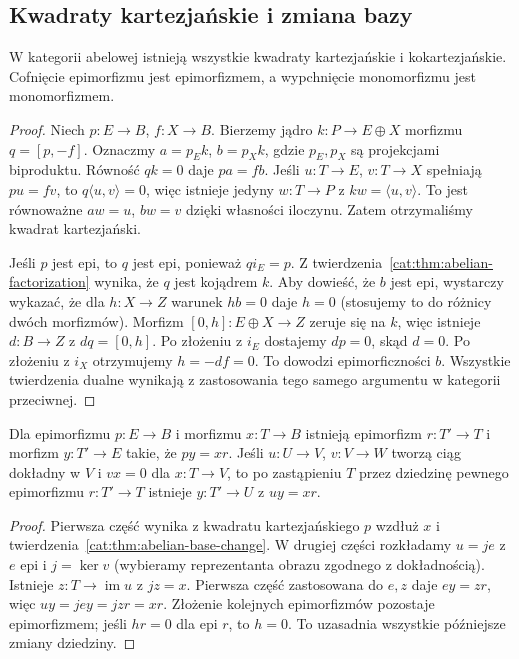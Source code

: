 \subsection{Kwadraty kartezjańskie i zmiana bazy}
\begin{twierdzenie}\label{cat:thm:abelian-base-change}
W kategorii abelowej istnieją wszystkie kwadraty kartezjańskie i kokartezjańskie. Cofnięcie epimorfizmu jest epimorfizmem, a wypchnięcie monomorfizmu jest monomorfizmem.
\end{twierdzenie}
\begin{proof}
Niech $p:E\to B$, $f:X\to B$. Bierzemy jądro $k:P\to E\oplus X$ morfizmu $q=[p,-f]$. Oznaczmy $a=p_E k$, $b=p_X k$, gdzie $p_E,p_X$ są projekcjami biproduktu. Równość $qk=0$ daje $pa=fb$. Jeśli $u:T\to E$, $v:T\to X$ spełniają $pu=fv$, to $q\langle u,v\rangle=0$, więc istnieje jedyny $w:T\to P$ z $kw=\langle u,v\rangle$. To jest równoważne $aw=u$, $bw=v$ dzięki własności iloczynu. Zatem otrzymaliśmy kwadrat kartezjański.
\begin{center}
\end{center}
Jeśli $p$ jest epi, to $q$ jest epi, ponieważ $qi_E=p$. Z twierdzenia~\ref{cat:thm:abelian-factorization} wynika, że $q$ jest kojądrem $k$. Aby dowieść, że $b$ jest epi, wystarczy wykazać, że dla $h:X\to Z$ warunek $hb=0$ daje $h=0$ (stosujemy to do różnicy dwóch morfizmów). Morfizm $[0,h]:E\oplus X\to Z$ zeruje się na $k$, więc istnieje $d:B\to Z$ z $dq=[0,h]$. Po złożeniu z $i_E$ dostajemy $dp=0$, skąd $d=0$. Po złożeniu z $i_X$ otrzymujemy $h=-df=0$. To dowodzi epimorficzności $b$. Wszystkie twierdzenia dualne wynikają z zastosowania tego samego argumentu w kategorii przeciwnej.
\end{proof}
\begin{lemat}\label{cat:lem:abelian-local-lift}
Dla epimorfizmu $p:E\to B$ i morfizmu $x:T\to B$ istnieją epimorfizm $r:T'\to T$ i morfizm $y:T'\to E$ takie, że $py=xr$. Jeśli $u:U\to V$, $v:V\to W$ tworzą ciąg dokładny w $V$ i $vx=0$ dla $x:T\to V$, to po zastąpieniu $T$ przez dziedzinę pewnego epimorfizmu $r:T'\to T$ istnieje $y:T'\to U$ z $uy=xr$.
\end{lemat}
\begin{proof}
Pierwsza część wynika z kwadratu kartezjańskiego $p$ wzdłuż $x$ i twierdzenia~\ref{cat:thm:abelian-base-change}. W drugiej części rozkładamy $u=je$ z $e$ epi i $j=\ker v$ (wybieramy reprezentanta obrazu zgodnego z dokładnością). Istnieje $z:T\to\operatorname{im}u$ z $jz=x$. Pierwsza część zastosowana do $e,z$ daje $ey=zr$, więc $uy=jey=jzr=xr$. Złożenie kolejnych epimorfizmów pozostaje epimorfizmem; jeśli $hr=0$ dla epi $r$, to $h=0$. To uzasadnia wszystkie późniejsze zmiany dziedziny.
\end{proof}

